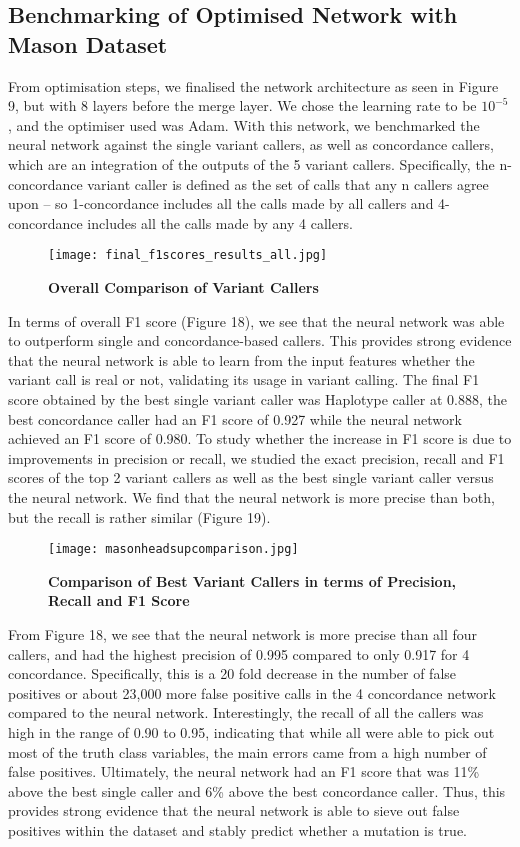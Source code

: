 \documentclass{article}
\begin{document}
\subsection{Benchmarking of Optimised Network with Mason Dataset}
From optimisation steps, we finalised the network architecture as seen in Figure 9, but with 8 layers before the merge layer. We chose the learning rate to be $10^{-5}$, and the optimiser used was Adam. With this network, we benchmarked the neural network against the single variant callers, as well as concordance callers, which are an integration of the outputs of the 5 variant callers. Specifically, the n-concordance variant caller is defined as the set of calls that any n callers agree upon -- so 1-concordance includes all the calls made by all callers and 4-concordance includes all the calls made by any 4 callers.
\begin{figure}[H]
\texttt{[image: final\_f1scores\_results\_all.jpg]}
\caption{\textbf{Overall Comparison of Variant Callers}}
\centering
\end{figure}
In terms of overall F1 score (Figure 18), we see that the neural network was able to outperform single and concordance-based callers. This provides strong evidence that the neural network is able to learn from the input features whether the variant call is real or not, validating its usage in variant calling. The final F1 score obtained by the best single variant caller was Haplotype caller at 0.888, the best concordance caller had an F1 score of 0.927 while the neural network achieved an F1 score of 0.980. To study whether the increase in F1 score is due to improvements in precision or recall, we studied the exact precision, recall and F1 scores of the top 2 variant callers as well as the best single variant caller versus the neural network. We find that the neural network is more precise than both, but the recall is rather similar (Figure 19). 
\begin{figure}[H]
\texttt{[image: masonheadsupcomparison.jpg]}
\caption{\textbf{Comparison of Best Variant Callers in terms of Precision, Recall and F1 Score}}
\centering
\end{figure}
From Figure 18, we see that the neural network is more precise than all four callers, and had the highest precision of 0.995 compared to only 0.917 for 4 concordance. Specifically, this is a 20 fold decrease in the number of false positives or about 23,000 more false positive calls in the 4 concordance network compared to the neural network. Interestingly, the recall of all the callers was high in the range of 0.90 to 0.95, indicating that while all were able to pick out most of the truth class variables, the main errors came from a high number of false positives. Ultimately, the neural network had an F1 score that was 11\% above the best single caller and 6\% above the best concordance caller. Thus, this provides strong evidence that the neural network is able to sieve out false positives within the dataset and stably predict whether a mutation is true.
\end{document}
